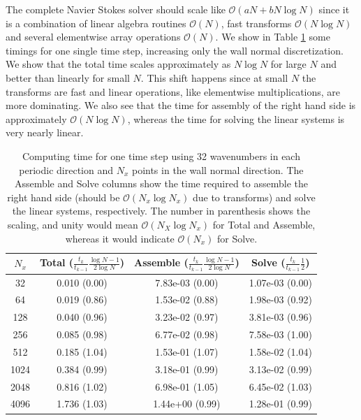 \documentclass[11pt, oneside]{elsarticle}
\begin{document}
The complete Navier Stokes solver should scale like $\mathcal{O}(aN + bN\log N)$ since it is a combination of linear algebra routines $\mathcal{O}(N)$, fast transforms $\mathcal{O}(N \log N)$ and several elementwise array operations $\mathcal{O}(N)$. We show in Table \ref{tab:timings_solver} some timings for one single time step, increasing only the wall normal discretization. We show that the total time scales approximately as $N \log N$ for large $N$ and better than linearly for small $N$. This shift happens since at small $N$ the transforms are fast and linear operations, like elementwise multiplications, are more dominating. We also see that the time for assembly of the right hand side is approximately $\mathcal{O}(N \log N)$, whereas the time for solving the linear systems is very nearly linear.

\begin{table}
	\centering
	\caption{Computing time for one time step using 32 wavenumbers in each periodic direction and $N_x$ points in the wall normal direction. The Assemble and Solve columns show the time required to assemble the right hand side (should be $\mathcal{O}(N_x \log N_x)$ due to transforms) and solve the linear systems, respectively. The number in parenthesis shows the scaling, and unity would mean $\mathcal{O}(N_X \log N_x)$ for Total and Assemble, whereas it would indicate $\mathcal{O}(N_x)$ for Solve. \label{tab:timings_solver}}
	\begin{tabular}{cccc}	
$N_x$ & Total ($\frac{t_k }{t_{k-1}} \frac{\log N-1}{2 \log N}$) & Assemble ($\frac{t_k }{t_{k-1}} \frac{\log N-1}{2 \log N}$) & Solve ($\frac{t_k}{t_{k-1}} \frac{1}{2}$) \\ 
\hline
32 & 0.010 (0.00) & 7.83e-03 (0.00) & 1.07e-03 (0.00) \\ 
64 & 0.019 (0.86) & 1.53e-02 (0.88) & 1.98e-03 (0.92) \\ 
128 & 0.040 (0.96) & 3.23e-02 (0.97) & 3.81e-03 (0.96) \\ 
256 & 0.085 (0.98) & 6.77e-02 (0.98) & 7.58e-03 (1.00) \\ 
512 & 0.185 (1.04) & 1.53e-01 (1.07) & 1.58e-02 (1.04) \\ 
1024 & 0.384 (0.99) & 3.18e-01 (0.99) & 3.13e-02 (0.99) \\ 
2048 & 0.816 (1.02) & 6.98e-01 (1.05) & 6.45e-02 (1.03) \\ 
4096 & 1.736 (1.03) & 1.44e+00 (0.99) & 1.28e-01 (0.99)
    \end{tabular}
\end{table}
\end{document}
